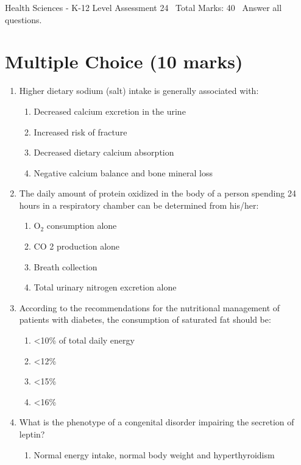 \documentclass[12pt]{article}
\begin{document}
\begin{center}
Health Sciences - K-12 Level Assessment 24 \
Total Marks: 40 \
Answer all questions.
\end{center}

\section*{Multiple Choice (10 marks)}
\begin{enumerate}[label=\arabic*.]
\item Higher dietary sodium (salt) intake is generally associated with:
\begin{enumerate}[label=(\alph*)]
    \item Decreased calcium excretion in the urine
    \item Increased risk of fracture
    \item Decreased dietary calcium absorption
    \item Negative calcium balance and bone mineral loss
\end{enumerate}
\item The daily amount of protein oxidized in the body of a person spending 24 hours in a respiratory chamber can be determined from his/her:
\begin{enumerate}[label=(\alph*)]
    \item O$_{2}$ consumption alone
    \item CO 2 production alone
    \item Breath collection
    \item Total urinary nitrogen excretion alone
\end{enumerate}
\item According to the recommendations for the nutritional management of patients with diabetes, the consumption of saturated fat should be:
\begin{enumerate}[label=(\alph*)]
    \item \textless{}10\% of total daily energy
    \item \textless{}12\%
    \item \textless{}15\%
    \item \textless{}16\%
\end{enumerate}
\item What is the phenotype of a congenital disorder impairing the secretion of leptin?
\begin{enumerate}[label=(\alph*)]
    \item Normal energy intake, normal body weight and hyperthyroidism

\end{enumerate}
\end{enumerate}
\end{document}
